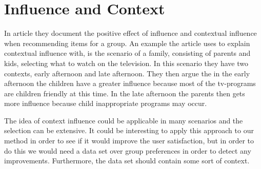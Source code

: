 \section{Influence and Context}
In article \cite{contextinfluence} they document the positive effect of influence and contextual influence when recommending items for a group. An example the article uses to explain contextual influence with, is the scenario of a family, consisting of parents and kids, selecting what to watch on the television. In this scenario they have two contexts, early afternoon and late afternoon. They then argue the in the early afternoon the children have a greater influence because most of the tv-programs are children friendly at this time. In the late afternoon the parents then gets more influence because child inappropriate programs may occur. 

The idea of context influence could be applicable in many scenarios and the selection can be extensive. It could be interesting to apply this approach to our method in order to see if it would improve the user satisfaction, but in order to do this we would need a data set over group preferences in order to detect any improvements. Furthermore, the data set should contain some sort of context. 